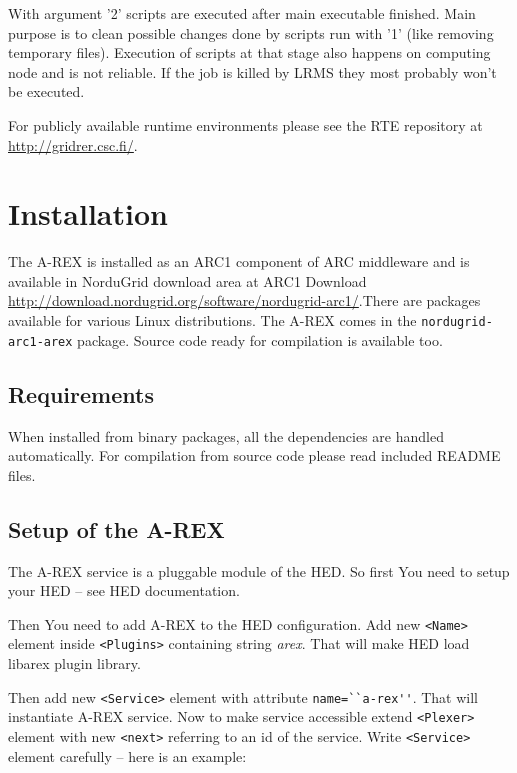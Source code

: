 \documentclass{article}                            %
\begin{document}
With argument '2' scripts are executed after main executable finished.
Main purpose is to clean possible changes done by scripts run with
'1' (like removing temporary files). Execution of scripts at that
stage also happens on computing node and is not reliable. If the job
is killed by LRMS they most probably won't be executed.

For publicly available runtime environments please see the RTE repository at \url{http://gridrer.csc.fi/}.

\section{Installation\label{sec:installation}}

The A-REX is installed as an ARC1 component of ARC middleware and is available
in NorduGrid download area at ARC1 Download \url{http://download.nordugrid.org/software/nordugrid-arc1/}.There are packages available for various Linux distributions. The
A-REX comes in the \texttt{nordugrid-arc1-arex} package. Source code ready for
compilation is available too.

\subsection{Requirements}

When installed from binary packages, all the dependencies are handled automatically.
For compilation from source code please read included README files.


\subsection{Setup of the A-REX}

The A-REX service is a pluggable module of the HED. So first You need
to setup your HED -- see HED documentation. 

Then You need to add A-REX to the HED configuration. Add new \verb|<Name>|
element inside \verb|<Plugins>| containing string \emph{arex}. That will
make HED load libarex plugin library. 

Then add new \verb|<Service>| element with attribute \verb|name=``a-rex''|. That
will instantiate A-REX service. Now to make service accessible extend
\verb|<Plexer>| element with new \verb|<next>| referring to an id of the service.
Write \verb|<Service>| element carefully -- here is an example:
\end{document}
